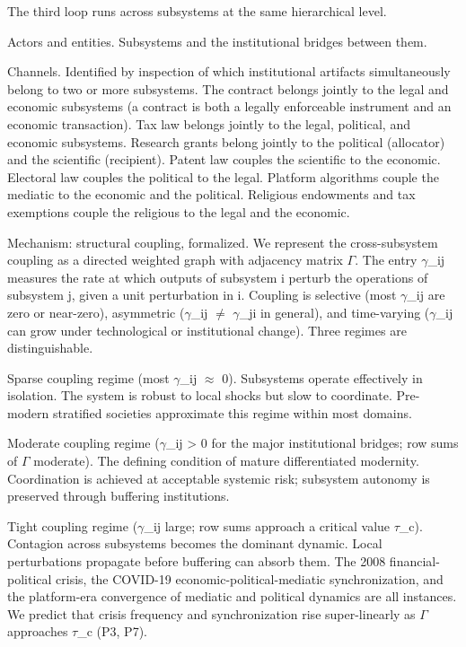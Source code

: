 \documentclass[12pt,a4paper]{article}
\begin{document}
The third loop runs across subsystems at the same hierarchical level.


Actors and entities. Subsystems and the institutional bridges between them.


Channels. Identified by inspection of which institutional artifacts simultaneously belong to two or more subsystems. The contract belongs jointly to the legal and economic subsystems (a contract is both a legally enforceable instrument and an economic transaction). Tax law belongs jointly to the legal, political, and economic subsystems. Research grants belong jointly to the political (allocator) and the scientific (recipient). Patent law couples the scientific to the economic. Electoral law couples the political to the legal. Platform algorithms couple the mediatic to the economic and the political. Religious endowments and tax exemptions couple the religious to the legal and the economic.


Mechanism: structural coupling, formalized. We represent the cross-subsystem coupling as a directed weighted graph with adjacency matrix $\Gamma$. The entry $\gamma$_{ij} measures the rate at which outputs of subsystem i perturb the operations of subsystem j, given a unit perturbation in i. Coupling is selective (most $\gamma$_{ij} are zero or near-zero), asymmetric ($\gamma$_{ij} $\neq$ $\gamma$_{ji} in general), and time-varying ($\gamma$_{ij} can grow under technological or institutional change). Three regimes are distinguishable.


Sparse coupling regime (most $\gamma$_{ij} $\approx$ 0). Subsystems operate effectively in isolation. The system is robust to local shocks but slow to coordinate. Pre-modern stratified societies approximate this regime within most domains.

Moderate coupling regime ($\gamma$_{ij} > 0 for the major institutional bridges; row sums of $\Gamma$ moderate). The defining condition of mature differentiated modernity. Coordination is achieved at acceptable systemic risk; subsystem autonomy is preserved through buffering institutions.

Tight coupling regime ($\gamma$_{ij} large; row sums approach a critical value $\tau$_c). Contagion across subsystems becomes the dominant dynamic. Local perturbations propagate before buffering can absorb them. The 2008 financial-political crisis, the COVID-19 economic-political-mediatic synchronization, and the platform-era convergence of mediatic and political dynamics are all instances. We predict that crisis frequency and synchronization rise super-linearly as $\Gamma$ approaches $\tau$_c (P3, P7).
\end{document}

